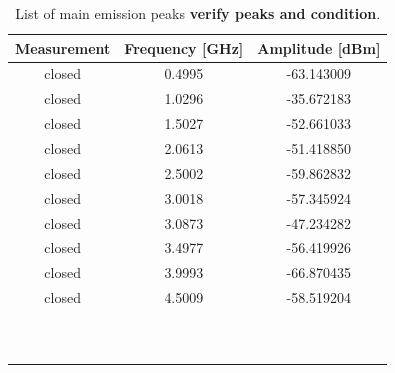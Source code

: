 \documentclass[12pt,a4paper,oneside]{article}
\begin{document}
\begin{table}[]
    \centering
   
    \begin{tabular}{|c|c|c|}
    \hline
         \cellcolor[gray]{0.85} Measurement & \cellcolor[gray]{0.85} Frequency [GHz] &  \cellcolor[gray]{0.85} Amplitude [dBm]\\ \hline
         closed & 0.4995 & -63.143009 \\ \hline
         closed & 1.0296 & -35.672183 \\ \hline
         closed & 1.5027 & -52.661033 \\ \hline
         closed & 2.0613 & -51.418850 \\ \hline
         closed & 2.5002 & -59.862832 \\ \hline
         closed & 3.0018 & -57.345924 \\ \hline
         closed & 3.0873 & -47.234282 \\ \hline
         closed & 3.4977 & -56.419926 \\ \hline
         closed & 3.9993 & -66.870435 \\ \hline
         closed & 4.5009 & -58.519204 \\ \hline
         & & \\ \hline
         & & \\ \hline
         & & \\ \hline
         & & \\ \hline
         & & \\ \hline
         & & \\ \hline
         & & \\ \hline
         & & \\ \hline
         & & \\ \hline
         & & \\ \hline
    \end{tabular}
    \caption{List of main emission peaks \textbf{verify peaks and condition}.}
    \label{tab:main_emission_peaks}
\end{table}
\end{document}
